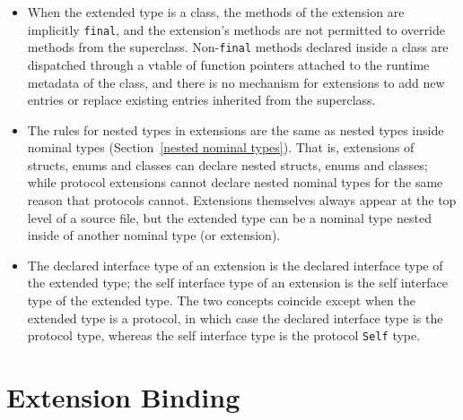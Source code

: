 \documentclass[../generics]{subfiles}
\begin{document}
\begin{itemize}
\item When the extended type is a class, the methods of the extension are implicitly \texttt{final}, and the extension's methods are not permitted to override methods from the superclass. Non-\texttt{final} methods declared inside a class are dispatched through a vtable of function pointers attached to the runtime metadata of the class, and there is no mechanism for extensions to add new entries or replace existing entries inherited from the superclass.

\item The rules for nested types in extensions are the same as nested types inside nominal types (Section~\ref{nested nominal types}). That is, extensions of structs, enums and classes can declare nested structs, enums and classes; while protocol extensions cannot declare nested nominal types for the same reason that protocols cannot. Extensions themselves always appear at the top level of a source file, but the extended type can be a nominal type nested inside of another nominal type (or extension).

\item The declared interface type of an extension is the declared interface type of the extended type; the self interface type of an extension is the self interface type of the extended type. The two concepts coincide except when the extended type is a protocol, in which case the declared interface type is the protocol type, whereas the self interface type is the protocol \texttt{Self} type.
\end{itemize}

\section{Extension Binding}\label{extension binding}
\end{document}
